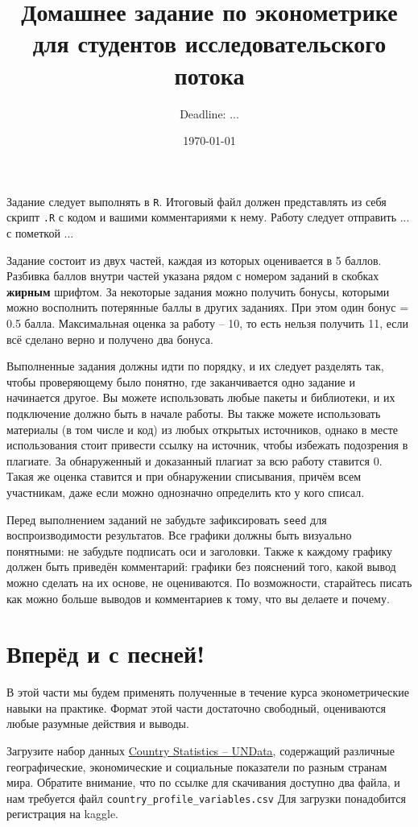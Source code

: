 \documentclass[10pt, a4paper]{extarticle}
\title{Домашнее задание по эконометрике для студентов исследовательского потока\vspace{-0.5em}}
\author{Deadline: ...}
\date{\today}
\newcommand{\code}[1]{{\tt #1}}
\begin{document}
\maketitle

\begin{shaded}
Задание следует выполнять в \code{R}. Итоговый файл должен представлять из себя скрипт \code{.R} с кодом и вашими комментариями к нему. Работу следует отправить ... с пометкой ...

Задание состоит из двух частей, каждая из которых оценивается в 5 баллов. Разбивка баллов внутри частей указана рядом с номером заданий в скобках \textbf{жирным} шрифтом. За некоторые задания можно получить бонусы, которыми можно восполнить потерянные баллы в других заданиях. При этом один бонус = 0.5 балла. Максимальная оценка за работу -- 10, то есть нельзя получить 11, если всё сделано верно и получено два бонуса.

Выполненные задания должны идти по порядку, и их следует разделять так, чтобы проверяющему было понятно, где заканчивается одно задание и начинается другое. Вы можете использовать любые пакеты и библиотеки, и их подключение должно быть в начале работы. Вы также можете использовать материалы (в том числе и код) из любых открытых источников, однако в месте использования стоит привести ссылку на источник, чтобы избежать подозрения в плагиате. За обнаруженный и доказанный плагиат за всю работу ставится 0. Такая же оценка ставится и при обнаружении списывания, причём всем участникам, даже если можно однозначно определить кто у кого списал. 

Перед выполнением заданий не забудьте зафиксировать \code{seed} для воспроизводимости результатов. Все графики должны быть визуально понятными: не забудьте подписать оси и заголовки. Также к каждому графику должен быть приведён комментарий: графики без пояснений того, какой вывод можно сделать на их основе, не оцениваются. По возможности, старайтесь писать как можно больше выводов и комментариев к тому, что вы делаете и почему.
\end{shaded}

\section{Вперёд и с песней!}
В этой части мы будем применять полученные в течение курса эконометрические навыки на практике. Формат этой части достаточно свободный, оцениваются любые разумные действия и выводы. 

Загрузите набор данных \href{https://www.kaggle.com/sudalairajkumar/undata-country-profiles}{Country Statistics -- UNData}, содержащий различные географические, экономические и социальные показатели по разным странам мира. Обратите внимание, что по ссылке для скачивания доступно два файла, и нам требуется файл {\tt country\_profile\_variables.csv} Для загрузки понадобится регистрация на kaggle. 
\end{document}
